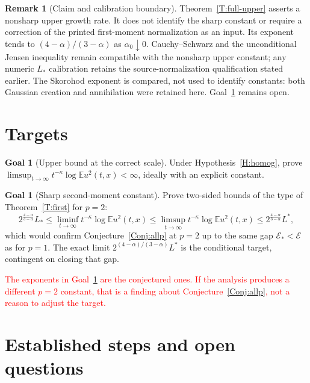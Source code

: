 \documentclass[12pt]{article}
\numberwithin{equation}{section}
\theoremstyle{definition}
\newtheorem{remark}[theorem]{Remark}
\newtheorem{goal}[theorem]{Goal}
\newcommand{\E}{\mathbb{E}}
\newcommand{\cE}{\mathcal{E}}
\newcommand{\myCmts}[1]{\begin{framed}\noindent\textcolor{red}{#1}\end{framed}}
\begin{document}
\begin{remark}[Claim and calibration boundary]\label{R:full-upper-boundary}
  Theorem~\ref{T:full-upper} asserts a nonsharp upper growth rate.
  It does not identify the sharp constant or require a correction of the
  printed first-moment normalization as an input.
  Its exponent tends to $(4-\alpha)/(3-\alpha)$ as $\alpha_0\downarrow0$.
  Cauchy--Schwarz and the unconditional Jensen inequality remain compatible
  with the nonsharp upper constant; any numeric $L_*$ calibration retains
  the source-normalization qualification stated earlier.
  The Skorohod exponent is compared, not used to identify constants:
  both Gaussian creation and annihilation were retained here.
  Goal~\ref{G:sharp} remains open.
\end{remark}


\section{Targets}\label{S:targets}

\begin{goal}[Upper bound at the correct scale]\label{G:upper}
  Under Hypothesis~\ref{H:homog}, prove
  $\limsup_{t\to\infty}t^{-\kappa}\log\E u^2(t,x)<\infty$, ideally with an
  explicit constant.
\end{goal}


\begin{goal}[Sharp second-moment constant]\label{G:sharp}
  Prove two-sided bounds of the type of Theorem~\ref{T:first} for $p=2$:
  \[
    2^{\frac{4-\alpha}{3-\alpha}}L_*
    \le\liminf_{t\to\infty}t^{-\kappa}\log\E u^2(t,x)
    \le\limsup_{t\to\infty}t^{-\kappa}\log\E u^2(t,x)
    \le2^{\frac{4-\alpha}{3-\alpha}}L^*,
  \]
  which would confirm Conjecture~\ref{Conj:allp} at $p=2$ up to the same gap
  $\cE_*<\cE$ as for $p=1$. The exact limit
  $2^{(4-\alpha)/(3-\alpha)}L^*$ is the conditional target, contingent on
  closing that gap.
\end{goal}

\myCmts{The exponents in Goal~\ref{G:sharp} are the conjectured ones. If
the analysis produces a different $p=2$ constant, that is a finding about
Conjecture~\ref{Conj:allp}, not a reason to adjust the target.}

\section{Established steps and open questions}\label{S:route}
\end{document}

